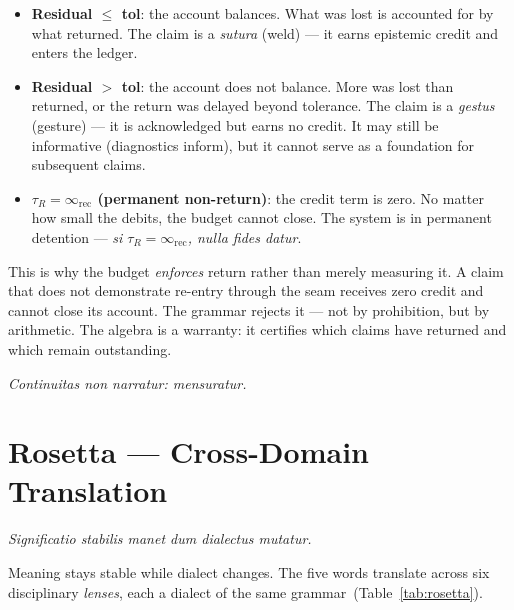 \documentclass[
  aps,
  prd,
  twocolumn,
  superscriptaddress,
  nofootinbib,
  floatfix
]{revtex4-2}
\newcommand{\tR}{\tau_{\!R}}
\newcommand{\IR}{\infty_{\mathrm{rec}}}
\newcommand{\lat}[1]{\textit{#1}}
\begin{document}
\begin{itemize}[nosep,leftmargin=*]
\item \textbf{Residual $\leq$ tol}: the account balances. What
  was lost is accounted for by what returned. The claim is a
  \lat{sutura} (weld) --- it earns epistemic credit and enters
  the ledger.
\item \textbf{Residual $>$ tol}: the account does not balance.
  More was lost than returned, or the return was delayed beyond
  tolerance. The claim is a \lat{gestus} (gesture) --- it is
  acknowledged but earns no credit. It may still be informative
  (diagnostics inform), but it cannot serve as a foundation for
  subsequent claims.
\item \textbf{$\tR = \IR$ (permanent non-return)}: the credit
  term is zero. No matter how small the debits, the budget
  cannot close. The system is in permanent detention ---
  \lat{si $\tR = \IR$, nulla fides datur}.
\end{itemize}

\noindent
This is why the budget \emph{enforces} return rather than merely
measuring it. A claim that does not demonstrate re-entry through
the seam receives zero credit and cannot close its account. The
grammar rejects it --- not by prohibition, but by arithmetic.
The algebra is a warranty: it certifies which claims have
returned and which remain outstanding.

\lat{Continuitas non narratur: mensuratur.}

\section{Rosetta --- Cross-Domain Translation}
  \label{sec:rosetta}

\lat{Significatio stabilis manet dum dialectus mutatur.}

\smallskip\noindent
Meaning stays stable while dialect changes. The five words
translate across six disciplinary \emph{lenses}, each a dialect
of the same grammar~(Table~\ref{tab:rosetta}).
\end{document}
